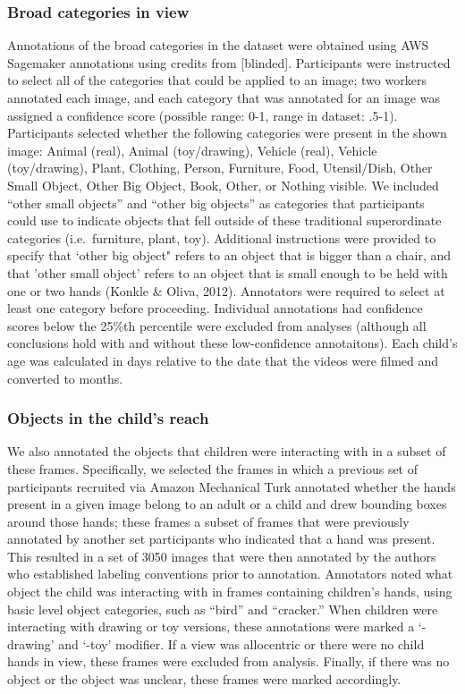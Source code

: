 \documentclass[10pt, letterpaper]{article}
\begin{document}
\hypertarget{broad-categories-in-view}{%
\subsubsection{Broad categories in
view}\label{broad-categories-in-view}}

Annotations of the broad categories in the dataset were obtained using
AWS Sagemaker annotations using credits from {[}blinded{]}. Participants
were instructed to select all of the categories that could be applied to
an image; two workers annotated each image, and each category that was
annotated for an image was assigned a confidence score (possible range:
0-1, range in dataset: .5-1). Participants selected whether the
following categories were present in the shown image: Animal (real),
Animal (toy/drawing), Vehicle (real), Vehicle (toy/drawing), Plant,
Clothing, Person, Furniture, Food, Utensil/Dish, Other Small Object,
Other Big Object, Book, Other, or Nothing visible. We included ``other
small objects'' and ``other big objects'' as categories that
participants could use to indicate objects that fell outside of these
traditional superordinate categories (i.e.~furniture, plant, toy).
Additional instructions were provided to specify that `other big object"
refers to an object that is bigger than a chair, and that 'other small
object' refers to an object that is small enough to be held with one or
two hands (Konkle \& Oliva, 2012). Annotators were required to select at
least one category before proceeding. Individual annotations had
confidence scores below the 25\%th percentile were excluded from
analyses (although all conclusions hold with and without these
low-confidence annotaitons). Each child's age was calculated in days
relative to the date that the videos were filmed and converted to
months.

\hypertarget{objects-in-the-childs-reach}{%
\subsubsection{Objects in the child's
reach}\label{objects-in-the-childs-reach}}

We also annotated the objects that children were interacting with in a
subset of these frames. Specifically, we selected the frames in which a
previous set of participants recruited via Amazon Mechanical Turk
annotated whether the hands present in a given image belong to an adult
or a child and drew bounding boxes around those hands; these frames a
subset of frames that were previously annotated by another set
participants who indicated that a hand was present. This resulted in a
set of 3050 images that were then annotated by the authors who
established labeling conventions prior to annotation. Annotators noted
what object the child was interacting with in frames containing
children's hands, using basic level object categories, such as ``bird''
and ``cracker.'' When children were interacting with drawing or toy
versions, these annotations were marked a `-drawing' and `-toy'
modifier. If a view was allocentric or there were no child hands in
view, these frames were excluded from analysis. Finally, if there was no
object or the object was unclear, these frames were marked accordingly.
\end{document}
